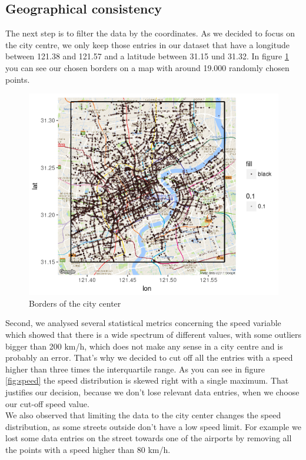 \documentclass[11pt,conference,a4paper,onecolumn,romanappendices]{IEEEtran}
\begin{document}
\subsection{Geographical consistency}
The next step is to filter the data by the coordinates. As we decided to focus on the city centre, we only keep those entries in our dataset that have a longitude between 121.38 and 121.57 and a latitude between 31.15 und 31.32. In figure \ref{fig:borders} you can see our chosen borders on a map with around 19.000 randomly chosen points.\\
\begin{figure}[h]
\centering
\includegraphics[scale=0.9]{borders.png}
\caption{\label{fig:borders}Borders of the city center}
\end{figure}
Second, we analysed several statistical metrics concerning the speed variable which showed that there is a wide spectrum of different values, with some outliers bigger than 200 km/h, which does not make any sense in a city centre and is probably an error. That's why we decided to cut off all the entries with a speed higher than three times the interquartile range. As you can see in figure \ref{fig:speed} the speed distribution is skewed right with a single maximum. That justifies our decision, because we don't lose relevant data entries, when we choose our cut-off speed value. \\
We also observed that limiting the data to the city center changes the speed distribution, as some streets outside don't have a low speed limit. For example we lost some data entries on the street towards one of the airports by removing all the points with a speed higher than 80 km/h. \\
\end{document}
